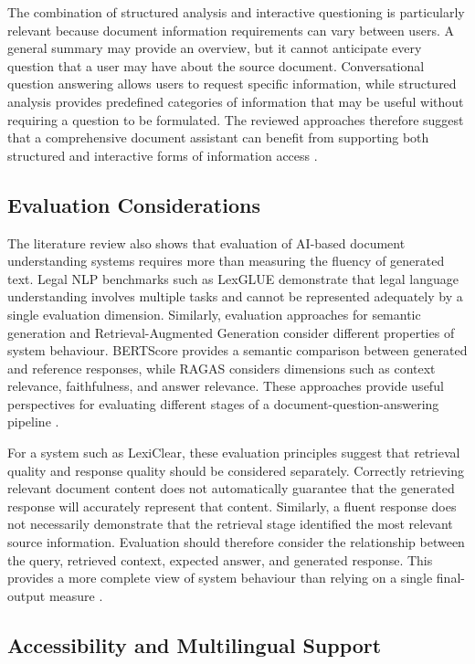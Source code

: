 \documentclass[12pt,a4paper,oneside]{report}
\begin{document}
The combination of structured analysis and interactive questioning is
particularly relevant because document information requirements can vary
between users. A general summary may provide an overview, but it cannot
anticipate every question that a user may have about the source document.
Conversational question answering allows users to request specific
information, while structured analysis provides predefined categories of
information that may be useful without requiring a question to be formulated.
The reviewed approaches therefore suggest that a comprehensive document
assistant can benefit from supporting both structured and interactive forms of
information access
\cite{kandula2023,nethriya2024}.

\subsection{Evaluation Considerations}

The literature review also shows that evaluation of AI-based document
understanding systems requires more than measuring the fluency of generated
text. Legal NLP benchmarks such as LexGLUE demonstrate that legal language
understanding involves multiple tasks and cannot be represented adequately by
a single evaluation dimension. Similarly, evaluation approaches for semantic
generation and Retrieval-Augmented Generation consider different properties
of system behaviour. BERTScore provides a semantic comparison between
generated and reference responses, while RAGAS considers dimensions such as
context relevance, faithfulness, and answer relevance. These approaches
provide useful perspectives for evaluating different stages of a
document-question-answering pipeline
\cite{chalkidis2022lexglue,es2024ragas}.

For a system such as LexiClear, these evaluation principles suggest that
retrieval quality and response quality should be considered separately.
Correctly retrieving relevant document content does not automatically
guarantee that the generated response will accurately represent that content.
Similarly, a fluent response does not necessarily demonstrate that the
retrieval stage identified the most relevant source information. Evaluation
should therefore consider the relationship between the query, retrieved
context, expected answer, and generated response. This provides a more
complete view of system behaviour than relying on a single final-output
measure
\cite{zhang2020bertscore,es2024ragas}.

\subsection{Accessibility and Multilingual Support}
\end{document}
